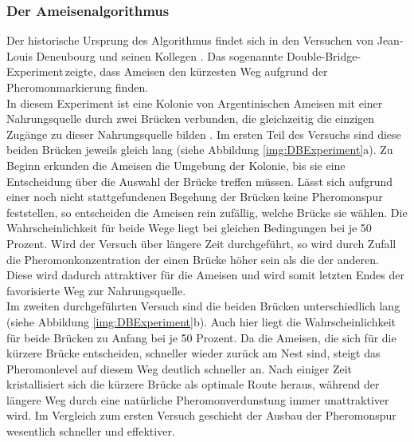 \documentclass[doktyp=barbeit, sprache=german]{TUBAFarbeiten}
\begin{document}
\subsubsection{Der Ameisenalgorithmus}
Der historische Ursprung des Algorithmus findet sich in den Versuchen von Jean-Louis Deneubourg und seinen Kollegen \cite{Biological}. Das sogenannte \glqq Double-Bridge-Experiment\grqq \,zeigte, dass Ameisen den kürzesten Weg aufgrund der Pheromonmarkierung finden. 
\\In diesem Experiment ist eine Kolonie von Argentinischen Ameisen mit einer Nahrungsquelle durch zwei Brücken verbunden, die gleichzeitig die einzigen Zugänge zu dieser Nahrungsquelle bilden \cite{Dorigo2007}. Im ersten Teil des Versuchs sind diese beiden Brücken jeweils gleich lang (siehe Abbildung \ref{img:DBExperiment}a). Zu Beginn erkunden die Ameisen die Umgebung der Kolonie, bis sie eine Entscheidung über die Auswahl der Brücke treffen müssen. Lässt sich aufgrund einer noch nicht stattgefundenen Begehung der Brücken keine Pheromonspur feststellen, so entscheiden die Ameisen rein zufällig, welche Brücke sie wählen. Die Wahrscheinlichkeit für beide Wege liegt bei gleichen Bedingungen bei je 50 Prozent. Wird der Versuch über längere Zeit durchgeführt, so wird durch Zufall die Pheromonkonzentration der einen Brücke höher sein als die der anderen. Diese wird dadurch attraktiver für die Ameisen und wird somit letzten Endes der favorisierte Weg zur Nahrungsquelle. 
\\Im zweiten durchgeführten Versuch sind die beiden Brücken unterschiedlich lang (siehe Abbildung \ref{img:DBExperiment}b). Auch hier liegt die Wahrscheinlichkeit für beide Brücken zu Anfang bei je 50 Prozent. Da die Ameisen, die sich für die kürzere Brücke entscheiden, schneller wieder zurück am Nest sind, steigt das Pheromonlevel auf diesem Weg deutlich schneller an. Nach einiger Zeit kristallisiert sich die kürzere Brücke als optimale Route heraus, während der längere Weg durch eine natürliche Pheromonverdunstung immer unattraktiver wird. Im Vergleich zum ersten Versuch geschieht der Ausbau der Pheromonspur wesentlich schneller und effektiver.
\end{document}
